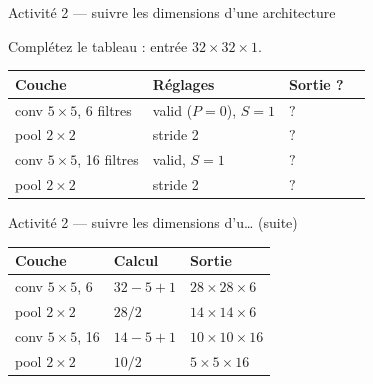 \begin{frame}{Activité 2 --- suivre les dimensions d'une architecture}
\begin{abox}
Complétez le tableau : entrée $32 \times 32 \times 1$.
\begin{center}
\small
\begin{tabular}{@{}llll@{}}
\toprule
\textbf{Couche} & \textbf{Réglages} & \textbf{Sortie ?} & \\
\midrule
conv $5 \times 5$, 6 filtres & valid ($P=0$), $S=1$ & $?$ & \\
pool $2 \times 2$ & stride 2 & $?$ & \\
conv $5 \times 5$, 16 filtres & valid, $S=1$ & $?$ & \\
pool $2 \times 2$ & stride 2 & $?$ & \\
\bottomrule
\end{tabular}
\end{center}
\end{abox}
\begin{solbox}

\end{solbox}
\end{frame}
\begin{frame}{Activité 2 --- suivre les dimensions d'u… (suite)}
\begin{center}
\small
\begin{tabular}{@{}lll@{}}
\toprule
\textbf{Couche} & \textbf{Calcul} & \textbf{Sortie} \\
\midrule
conv $5 \times 5$, 6 & $32 - 5 + 1$ & $28 \times 28 \times 6$ \\
pool $2 \times 2$ & $28 / 2$ & $14 \times 14 \times 6$ \\
conv $5 \times 5$, 16 & $14 - 5 + 1$ & $10 \times 10 \times 16$ \\
pool $2 \times 2$ & $10 / 2$ & $5 \times 5 \times 16$ \\
\bottomrule
\end{tabular}
\end{center}
\end{frame}

